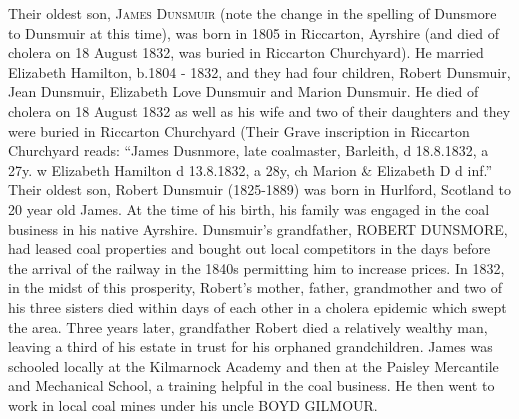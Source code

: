 {Their oldest son, \textsc{James Dunsmuir} (note the change in the spelling of Dunsmore to Dunsmuir at this time), was born in	1805 in Riccarton, Ayrshire (and died of cholera on 18 August 1832, was buried in Riccarton Churchyard). He married Elizabeth Hamilton, b.1804 - 1832, and they had four children, Robert Dunsmuir, Jean Dunsmuir, Elizabeth Love Dunsmuir and Marion Dunsmuir. He died of cholera on 18 August 1832 as well as his wife and two of their daughters and they were buried in Riccarton Churchyard (Their Grave inscription in Riccarton Churchyard reads: ``James Dusnmore, late coalmaster, Barleith, d 18.8.1832, a 27y. w Elizabeth Hamilton d 13.8.1832, a 28y, ch Marion & Elizabeth D d inf.'' Their oldest son, Robert Dunsmuir (1825-1889) was born in Hurlford, Scotland to 20 year old James. At the time of his birth, his family was engaged in the coal business in his native Ayrshire. Dunsmuir's grandfather, \uppercase{Robert Dunsmore}, had leased coal properties and bought out local competitors in the days before the arrival of the railway in the 1840s permitting him to increase prices. In 1832, in the midst of this prosperity, Robert's mother, father, grandmother and two of his three sisters died within days of each other in a cholera epidemic which swept the area. Three years later, grandfather Robert died a relatively wealthy man, leaving a third of his estate in trust for his orphaned grandchildren. James was schooled locally at the Kilmarnock Academy and then at the Paisley Mercantile and Mechanical School, a training helpful in the coal business. He then went to work in local coal mines under his uncle \uppercase{Boyd Gilmour}.
}
